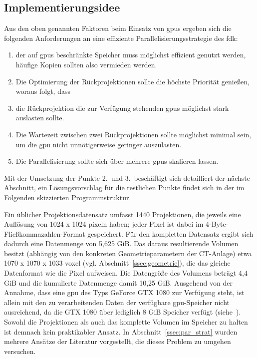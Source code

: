 \subsection{Implementierungsidee}\label{ssec:implementierungsidee}

Aus den oben genannten Faktoren beim Einsatz von \gls{gpu}s ergeben sich die folgenden Anforderungen an eine effiziente
Parallelisierungsstrategie des \gls{fdk}:

\begin{enumerate}
    \item der auf \gls{gpu}s beschränkte Speicher muss möglichst effizient genutzt werden, häufige Kopien sollten also
          vermieden werden.
    \item Die Optimierung der Rückprojektionen sollte die höchste Priorität genießen, woraus folgt, dass
    \item die Rückprojektion die zur Verfügung stehenden \gls{gpu}s möglichst stark auslasten sollte.
    \item Die Wartezeit zwischen zwei Rückprojektionen sollte möglichst minimal sein, um die \gls{gpu} nicht
          unnötigerweise geringer auszulasten.
    \item Die Parallelisierung sollte sich über mehrere \gls{gpu}s skalieren lassen.
\end{enumerate}

Mit der Umsetzung der Punkte 2.\ und 3.\ beschäftigt sich detailliert der nächste Abschnitt, ein Lösungsvorschlag für
die restlichen Punkte findet sich in der im Folgenden skizzierten Programmstruktur.

Ein üblicher Projektionsdatensatz umfasst 1440 Projektionen, die jeweils eine Auflösung von 1024 x 1024 \gls{pixel}n
haben; jeder Pixel ist dabei im 4-Byte-Fließkommazahlen-Format gespeichert. Für den kompletten Datensatz ergibt sich
dadurch eine Datenmenge von 5,625 GiB. Das daraus resultierende Volumen besitzt (abhängig von den konkreten
Geometrieparametern der CT-Anlage) etwa 1070 x 1070 x 1033 \gls{voxel} (vgl. Abschnitt~\ref{ssec:geometrie}), die das
gleiche Datenformat wie die Pixel aufweisen. Die Datengröße des Volumens beträgt 4,4 GiB und die kumulierte Datenmenge
damit 10,25 GiB. Ausgehend von der Annahme, dass eine \gls{gpu} des Typs GeForce GTX 1080 zur Verfügung steht, ist
allein mit den zu verarbeitenden Daten der verfügbare \gls{gpu}-Speicher nicht ausreichend, da die GTX 1080 über
lediglich 8 GiB Speicher verfügt (siehe~\cite{gtx1080}). Sowohl die Projektionen als auch das komplette Volumen im
Speicher zu halten ist demnach kein praktikabler Ansatz. In Abschnitt~\ref{ssec:par_strat} wurden mehrere Ansätze der
Literatur vorgestellt, die dieses Problem zu umgehen versuchen.

